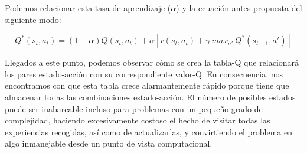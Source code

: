 Podemos relacionar esta tasa de aprendizaje ($\alpha$) y la ecuación antes propuesta del siguiente modo:

$$Q^*(s_{t}, a_{t}) = (1-\alpha ) Q(s_{t}, a_{t}) + \alpha [r(s_{t}, a_{t}) + \gamma\ max_{a'}\ Q^*(s_{t+1}, a')]$$

Llegados a este punto, podemos observar cómo se crea la tabla-Q que relacionará los pares estado-acción con su correspondiente valor-Q. En consecuencia, nos encontramos con que esta tabla crece alarmantemente rápido porque tiene que almacenar todas las combinaciones estado-acción. El número de posibles estados puede ser inabarcable incluso para problemas con un pequeño grado de complejidad, haciendo excesivamente costoso el hecho de visitar todas las experiencias recogidas, así como de actualizarlas, y convirtiendo el problema en algo inmanejable desde un punto de vista computacional.